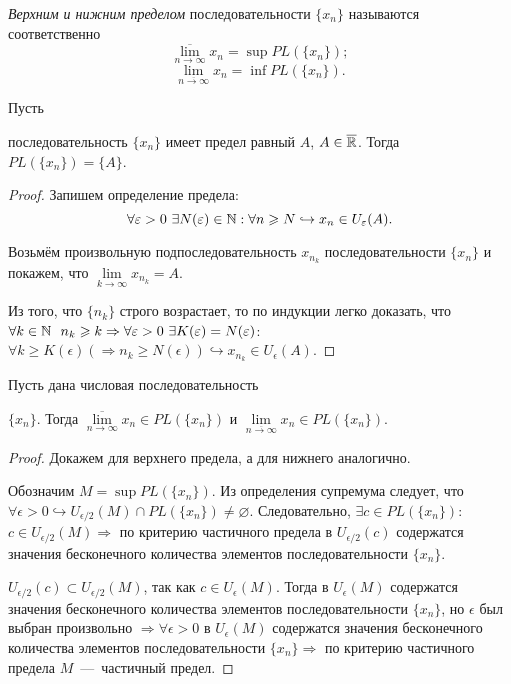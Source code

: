 \begin{definition}
    \textit{Верхним и нижним пределом} последовательности $\{ x_{n} \}$ называются соответственно
    $$ \overline{\lim\limits_{n\to \infty}} x_{n} = \sup PL (\{ x_{n} \});$$
    $$ \lim\limits_{\overline{n\to \infty}} x_{n} = \inf PL (\{ x_{n} \}).$$
\end{definition}
\begin{lemma}
    \hypertarget{lemm2.9}{Пусть} последовательность $\{ x_{n} \}$ имеет предел равный $A$, $A \in \overline{\mathbb{R}}$. Тогда $PL (\{ x_{n} \}) = \{A \}$.
\end{lemma}
\begin{proof}
    Запишем определение предела:
    $$ \forall \varepsilon > 0 \  \exists N (\varepsilon) \in \mathbb{N}: \forall n \geqslant N \hookrightarrow x_{n} \in U_{\varepsilon} (A).$$

    Возьмём произвольную подпоследовательность $x_{n_{k}}$ последовательности $\{ x_{n} \}$ и покажем, что $\lim\limits_{k\to \infty} x_{n_{k}} = A$.

    Из того, что $\{n_{k}\}$ строго возрастает, то по индукции легко доказать, что $\forall k \in \mathbb{N} \ \ n_{k} \geqslant k \Rightarrow \forall \varepsilon > 0 \  \exists K (\varepsilon) = N (\varepsilon)$: $\forall k \geq K (\epsilon) (\Rightarrow n_{k} \geq N (\epsilon)) \hookrightarrow x_{n_{k}} \in U_{\epsilon} (A)$.
\end{proof}
\begin{theorem}
    \hypertarget{thm2.10}{Пусть дана числовая последовательность} $\{ x_{n} \}$. Тогда $\overline{\lim\limits_{n\to \infty}} x_{n} \in PL (\{ x_{n}\})$ и $\lim\limits_{\overline{n\to \infty}} x_{n} \in PL (\{ x_{n} \})$.
\end{theorem}
\begin{proof}
    Докажем для верхнего предела, а для нижнего аналогично.

    Обозначим $M = \sup PL (\{ x_{n} \})$. Из определения супремума следует, что $\forall \epsilon > 0 \hookrightarrow U_{\epsilon / 2} (M) \cap PL (\{ x_{n} \}) \neq \varnothing.$ Следовательно, $\exists c \in PL (\{ x_{n} \})$: $c \in U_{\epsilon / 2} (M) \Rightarrow$ по критерию частичного предела в $U_{\epsilon / 2} (c)$ содержатся значения бесконечного количества элементов последовательности $\{ x_{n} \}$.

    $U_{\epsilon / 2} (c) \subset U_{\epsilon / 2} (M)$, так как $c \in U_{\epsilon} (M)$. Тогда в $U_{\epsilon} (M)$ содержатся значения бесконечного количества элементов последовательности $\{ x_{n} \}$, но $\epsilon$ был выбран произвольно $\Rightarrow \forall \epsilon > 0$ в $U_{\epsilon} (M)$ содержатся значения бесконечного количества элементов последовательности $\{ x_{n} \} \Rightarrow$ по критерию частичного предела $M$~---~частичный предел.
\end{proof}
